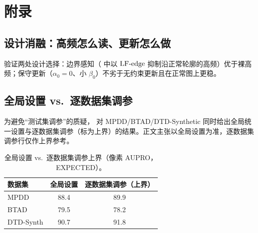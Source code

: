 \section{附录}
\label{sec:appendix}

\subsection{设计消融：高频怎么读、更新怎么做}
 验证两处设计选择：边界感知（ 中以 $\mathrm{LF\text{-}edge}$ 抑制沿正常轮廓的高频）优于裸高频；保守更新（$\alpha_0{=}0$、小 $\beta_0$）不劣于无约束更新且在正常图上更稳。

\begin{table}[h]\centering
\caption{设计消融（MVTec，EXPECTED）。}
\label{tab:ablation-design}
\end{table}

\subsection{全局设置 vs.\ 逐数据集调参}
为避免“测试集调参”的质疑， 对 MPDD/BTAD/DTD-Synthetic 同时给出全局统一设置与逐数据集调参（标为上界）的结果。正文主张以全局设置为准，逐数据集调参行仅作上界参考。

\begin{table}[h]\centering
\caption{全局设置 vs.\ 逐数据集调参上界（像素 AUPRO，EXPECTED）。}
\label{tab:global-tuned}
\begin{tabular}{lcc}
\toprule
数据集 & 全局设置 & 逐数据集调参（上界） \\
\midrule
MPDD      & 88.4 & 89.9 \\
BTAD      & 79.5 & 78.2 \\
DTD-Synth & 90.7 & 91.8 \\
\bottomrule
\end{tabular}
\end{table}

